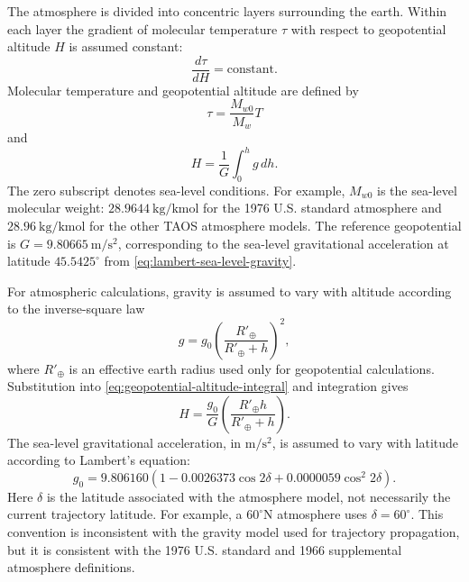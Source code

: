 The atmosphere is divided into concentric layers surrounding the earth. Within each
layer the gradient of molecular temperature $\tau$ with respect to geopotential
altitude $H$ is assumed constant:
\begin{equation}
  \frac{d\tau}{dH}=\text{constant}.
  \label{eq:molecular-temperature-gradient}
\end{equation}
Molecular temperature and geopotential altitude are defined by
\begin{equation}
  \tau=\frac{M_{w0}}{M_w}T
  \label{eq:molecular-temperature-definition}
\end{equation}
and
\begin{equation}
  H=\frac{1}{G}\int_0^h g\,dh.
  \label{eq:geopotential-altitude-integral}
\end{equation}
The zero subscript denotes sea-level conditions. For example, $M_{w0}$ is the
sea-level molecular weight: $28.9644\ \mathrm{kg/kmol}$ for the 1976 U.S.
standard atmosphere and $28.96\ \mathrm{kg/kmol}$ for the other TAOS atmosphere
models. The reference geopotential is
$G=9.80665\ \mathrm{m/s^2}$, corresponding to the sea-level gravitational
acceleration at latitude $45.5425^\circ$ from
\cref{eq:lambert-sea-level-gravity}.

For atmospheric calculations, gravity is assumed to vary with altitude according to
the inverse-square law
\begin{equation}
  g=g_0\left(\frac{R'_{\oplus}}{R'_{\oplus}+h}\right)^2,
  \label{eq:atmos-gravity-inverse-square}
\end{equation}
where $R'_{\oplus}$ is an effective earth radius used only for geopotential
calculations. Substitution into \cref{eq:geopotential-altitude-integral} and
integration gives
\begin{equation}
  H=\frac{g_0}{G}\left(\frac{R'_{\oplus}h}{R'_{\oplus}+h}\right).
  \label{eq:geopotential-altitude-closed-form}
\end{equation}
The sea-level gravitational acceleration, in $\mathrm{m/s^2}$, is assumed to vary
with latitude according to Lambert's equation:
\begin{equation}
  g_0=9.806160\left(1-0.0026373\cos 2\delta
                      +0.0000059\cos^2 2\delta\right).
  \label{eq:lambert-sea-level-gravity}
\end{equation}
Here $\delta$ is the latitude associated with the atmosphere model, not necessarily
the current trajectory latitude. For example, a $60^\circ$N atmosphere uses
$\delta=60^\circ$. This convention is inconsistent with the gravity model used for
trajectory propagation, but it is consistent with the 1976 U.S. standard and 1966
supplemental atmosphere definitions.

